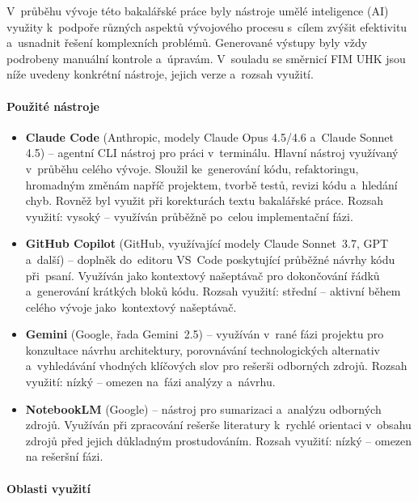 V~průběhu vývoje této bakalářské práce byly nástroje umělé inteligence (AI) využity k~podpoře různých aspektů vývojového procesu s~cílem zvýšit efektivitu a~usnadnit řešení komplexních problémů. Generované výstupy byly vždy podrobeny manuální kontrole a~úpravám. V~souladu se směrnicí FIM UHK jsou níže uvedeny konkrétní nástroje, jejich verze a~rozsah využití.

\paragraph{Použité nástroje}

\begin{itemize}
    \item \textbf{Claude Code} (Anthropic, modely Claude Opus 4.5/4.6 a~Claude Sonnet 4.5) -- agentní CLI nástroj pro práci v~terminálu. Hlavní nástroj využívaný v~průběhu celého vývoje. Sloužil ke~generování kódu, refaktoringu, hromadným změnám napříč projektem, tvorbě testů, revizi kódu a~hledání chyb. Rovněž byl využit při korekturách textu bakalářské práce. Rozsah využití: vysoký -- využíván průběžně po~celou implementační fázi.

    \item \textbf{GitHub Copilot} (GitHub, využívající modely Claude Sonnet~3.7, GPT a~další) -- doplněk do~editoru VS~Code poskytující průběžné návrhy kódu při~psaní. Využíván jako kontextový našeptávač pro dokončování řádků a~generování krátkých bloků kódu. Rozsah využití: střední -- aktivní během celého vývoje jako~kontextový našeptávač.

    \item \textbf{Gemini} (Google, řada Gemini~2.5) -- využíván v~rané fázi projektu pro konzultace návrhu architektury, porovnávání technologických alternativ a~vyhledávání vhodných klíčových slov pro rešerši odborných zdrojů. Rozsah využití: nízký -- omezen na~fázi analýzy a~návrhu.

    \item \textbf{NotebookLM} (Google) -- nástroj pro sumarizaci a~analýzu odborných zdrojů. Využíván při zpracování rešerše literatury k~rychlé orientaci v~obsahu zdrojů před jejich důkladným prostudováním. Rozsah využití: nízký -- omezen na rešeršní fázi.
\end{itemize}

\paragraph{Oblasti využití}

